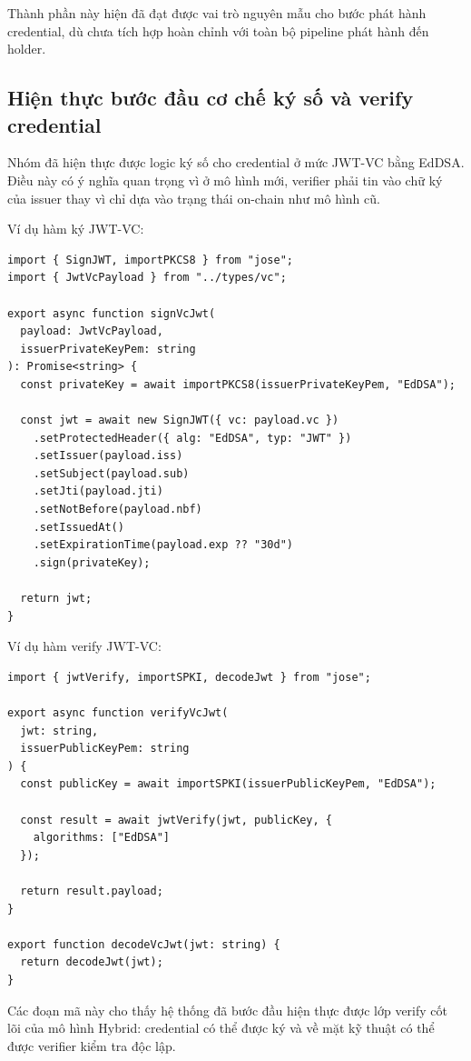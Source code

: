 Thành phần này hiện đã đạt được vai trò nguyên mẫu cho bước phát hành credential, dù chưa tích hợp hoàn chỉnh với toàn bộ pipeline phát hành đến holder.

\subsection{Hiện thực bước đầu cơ chế ký số và verify credential}

Nhóm đã hiện thực được logic ký số cho credential ở mức JWT-VC bằng EdDSA. Điều này có ý nghĩa quan trọng vì ở mô hình mới, verifier phải tin vào chữ ký của issuer thay vì chỉ dựa vào trạng thái on-chain như mô hình cũ.

Ví dụ hàm ký JWT-VC:

\begin{lstlisting}[caption={Hàm ký JWT-VC bằng khóa issuer}, label={lst:sign_vc_midterm}]
import { SignJWT, importPKCS8 } from "jose";
import { JwtVcPayload } from "../types/vc";

export async function signVcJwt(
  payload: JwtVcPayload,
  issuerPrivateKeyPem: string
): Promise<string> {
  const privateKey = await importPKCS8(issuerPrivateKeyPem, "EdDSA");

  const jwt = await new SignJWT({ vc: payload.vc })
    .setProtectedHeader({ alg: "EdDSA", typ: "JWT" })
    .setIssuer(payload.iss)
    .setSubject(payload.sub)
    .setJti(payload.jti)
    .setNotBefore(payload.nbf)
    .setIssuedAt()
    .setExpirationTime(payload.exp ?? "30d")
    .sign(privateKey);

  return jwt;
}
\end{lstlisting}

Ví dụ hàm verify JWT-VC:

\begin{lstlisting}[caption={Hàm verify JWT-VC bằng khóa công khai}, label={lst:verify_vc_midterm}]
import { jwtVerify, importSPKI, decodeJwt } from "jose";

export async function verifyVcJwt(
  jwt: string,
  issuerPublicKeyPem: string
) {
  const publicKey = await importSPKI(issuerPublicKeyPem, "EdDSA");

  const result = await jwtVerify(jwt, publicKey, {
    algorithms: ["EdDSA"]
  });

  return result.payload;
}

export function decodeVcJwt(jwt: string) {
  return decodeJwt(jwt);
}
\end{lstlisting}

Các đoạn mã này cho thấy hệ thống đã bước đầu hiện thực được lớp verify cốt lõi của mô hình Hybrid: credential có thể được ký và về mặt kỹ thuật có thể được verifier kiểm tra độc lập.

